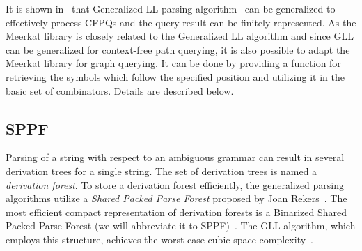 It is shown in~\cite{GrigorevR16} that Generalized LL parsing algorithm~\cite{scott2010gll} can be generalized to effectively process CFPQs and the query result can be finitely represented.
As the Meerkat library is closely related to the Generalized LL algorithm and since GLL can be generalized for context-free path querying, it is also possible to adapt the Meerkat library for graph querying.
It can be done by providing a function for retrieving the symbols which follow the specified position and utilizing it in the basic set of combinators.
Details are described below.





\subsection{SPPF}

Parsing of a string with respect to an ambiguous grammar can result in several derivation trees for a single string.
The set of derivation trees is named a \emph{derivation forest}.
To store a derivation forest efficiently, the generalized parsing algorithms utilize a \emph{Shared Packed Parse Forest} proposed by Joan Rekers~\cite{SPPF}.
The most efficient compact representation of derivation forests is a Binarized Shared Packed Parse Forest (we will abbreviate it to SPPF)~\cite{brnglr}.
The GLL algorithm, which employs this structure, achieves the worst-case cubic space complexity~\cite{gllParsingTree}.


